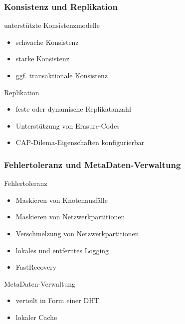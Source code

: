 \documentclass{beamer}
\begin{document}
	\begin{frame}
		\frametitle{Konsistenz und Replikation}

		\begin{block}{unterstützte Konsistenzmodelle}
			\begin{itemize}
				\item schwache Konsistenz
				\item starke Konsistenz
				\item ggf. transaktionale Konsistenz
			\end{itemize}
		\end{block}

		\begin{block}{Replikation}
			\begin{itemize}
				\item feste oder dynamische Replikatanzahl
				\item Unterstützung von Erasure-Codes
				\item CAP-Dilema-Eigenschaften konfigurierbar
			\end{itemize}
		\end{block}
	\end{frame}

	\begin{frame}
		\frametitle{Fehlertoleranz und MetaDaten-Verwaltung}

		\begin{block}{Fehlertoleranz}
			\begin{itemize}
				\item Maskieren von Knotenausfälle
				\item Maskieren von Netzwerkpartitionen
				\item Verschmelzung von Netzwerkpartitionen
				\item lokales und entferntes Logging
				\item FastRecovery
			\end{itemize}
		\end{block}

		\begin{block}{MetaDaten-Verwaltung}
			\begin{itemize}
				\item verteilt in Form einer DHT
				\item lokaler Cache
			\end{itemize}
		\end{block}
	\end{frame}
\end{document}
